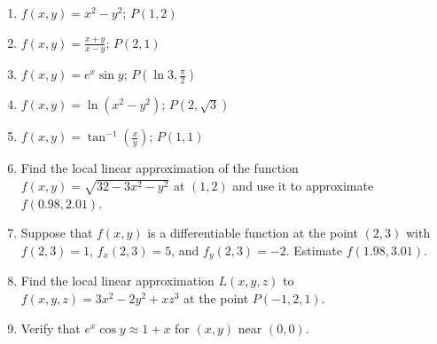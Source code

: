 \documentclass[12pt]{article}
\newif\ifans
\begin{document}
\begin{enumerate}

\item $f(x,y)=x^2-y^2$; $P(1,2)$

\ifans{\fbox{$L(x,y)=3+2x-4y$}}\fi

\item $f(x,y)=\frac{x+y}{x-y}$; $P(2,1)$

\ifans{\fbox{$L(x,y)=3-2x+4y$}}\fi

\item $f(x,y)=e^x\sin{y}$; $P\left(\ln3,\frac{\pi}{2}\right)$

\ifans{\fbox{$L(x,y)=3-3\ln{3}+3x$}}\fi

\item $f(x,y)=\ln{(x^2-y^2)}$; $P\left(2,\sqrt{3}\right)$

\ifans{\fbox{$L(x,y)=-2+4x-2\sqrt{3}y$}}\fi

\item $f(x,y)=\tan^{-1}\left(\frac{x}{y}\right)$; $P(1,1)$

\ifans{\fbox{$L(x,y)=\frac{\pi}{4}+\frac{1}{2}x-\frac{1}{2}y$}}\fi

\item Find the local linear approximation of the function $f(x,y)=\sqrt{32-3x^2-y^2}$ at $(1,2)$ and use it to approximate $f(0.98,2.01)$. 

\ifans{\fbox{\parbox{0.65\linewidth}{$f(x,y)\approx L(x,y)=\frac{32}{5}-\frac{3}{5}x-\frac{2}{5}y$ for $(x,y)$ near $(1,2)$.\\
\\
 So, $f(0.98,2.01)\approx L(0.98,2.01)=\frac{626}{125}$}}}\fi

\item Suppose that $f(x,y)$ is a differentiable function at the point $(2,3)$ with $f(2,3)=1$, $f_x(2,3)=5$, and $f_y(2,3)=-2$.  Estimate $f(1.98,3.01)$.

\ifans{\fbox{\parbox{0.65\linewidth}{$f(x,y)\approx L(x,y)=-3+5x-2y$ for $(x,y)$ near $(2,3)$.\\
So, $f(1.98,3.01)\approx L(1.98,3.01)=0.88$}}}\fi

\item Find the local linear approximation $L(x,y,z)$ to $f(x,y,z)=3x^2-2y^2+xz^3$ at the point $P(-1,2,1)$.

\ifans{\fbox{$L(x,y,z)=8-5x-8y-3z$}}\fi

\item Verify that $e^x\cos{y} \approx 1+x$ for $(x,y)$ near $(0,0)$.


\end{enumerate}
\end{document}
